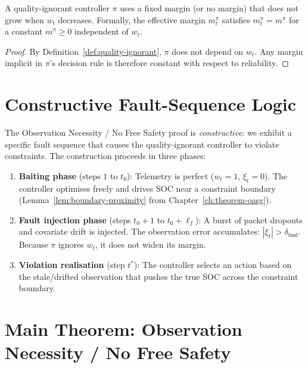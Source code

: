 \begin{lemma}
\label{lem:no-margin}
A quality-ignorant controller $\pi$ uses a fixed margin (or no margin)
that does not grow when $w_t$ decreases.  Formally, the effective
margin $m_t^{\pi}$ satisfies
$m_t^{\pi} = m^{\pi}$ for a constant $m^{\pi} \ge 0$ independent
of $w_t$.
\end{lemma}

\begin{proof}
By Definition~\ref{def:quality-ignorant}, $\pi$ does not depend on
$w_t$.  Any margin implicit in $\pi$'s decision rule is therefore
constant with respect to reliability.
\end{proof}

\section{Constructive Fault-Sequence Logic}

The Observation Necessity / No Free Safety proof is \emph{constructive}: we exhibit a specific
fault sequence that causes the quality-ignorant controller to violate
constraints.  The construction proceeds in three phases:

\begin{enumerate}
  \item \textbf{Baiting phase} (steps $1$ to $t_0$): Telemetry is
    perfect ($w_t = 1$, $\xi_t = 0$).  The controller optimises
    freely and drives SOC near a constraint boundary
    (Lemma~\ref{lem:boundary-proximity} from Chapter~\ref{ch:theorem-oasg}).

  \item \textbf{Fault injection phase} (steps $t_0 + 1$ to $t_0 + \ell_f$):
    A burst of packet dropouts and covariate drift is injected.
    The observation error accumulates: $|\xi_t| > \delta_{\text{bnd}}$.
    Because $\pi$ ignores $w_t$, it does not widen its margin.

  \item \textbf{Violation realisation} (step $t^*$): The controller
    selects an action based on the stale/drifted observation that
    pushes the true SOC across the constraint boundary.
\end{enumerate}

\section{Main Theorem: Observation Necessity / No Free Safety}

